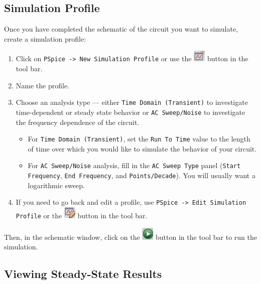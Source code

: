 \documentclass[11pt]{article}
\begin{document}
\subsection{Simulation Profile}

Once you have completed the schematic of the circuit you want to
simulate, create a simulation profile:

\begin{enumerate}
\item Click on \texttt{PSpice -> New Simulation Profile} or use the
  \includegraphics{OrCAD_NewSimProf.png} button in the tool bar.

\item Name the profile.

\item Choose an analysis type --- either \texttt{Time Domain
  (Transient)} to investigate time-dependent or steady state behavior
  or \texttt{AC Sweep/Noise} to investigate the frequency dependence
  of the circuit.
  \begin{itemize}
  \item For \texttt{Time Domain (Transient)}, set the \texttt{Run
    To Time} value to the length of time over which you would like to
    simulate the behavior of your circuit. 
    
  \item For \texttt{AC Sweep/Noise} analysis, fill in the \texttt{AC
    Sweep Type} panel (\texttt{Start Frequency}, \texttt{End
    Frequency}, and \texttt{Points/Decade}). You will usually want a
    logarithmic sweep.
  \end{itemize}

  \item If you need to go back and edit a profile, use \texttt{PSpice
    -> Edit Simulation Profile} or the
    \includegraphics{OrCAD_EditSimProf.png} button in the tool bar.
\end{enumerate}

Then, in the schematic window, click on the 
\includegraphics{OrCAD_RunSim.png} button in the tool bar to run the
simulation. 

\subsection{Viewing Steady-State Results}
\end{document}
